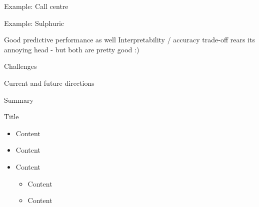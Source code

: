 \begin{frame}{Example: Call centre}
\end{frame}

\begin{frame}{Example: Sulphuric}
\end{frame}

\begin{frame}{Good predictive performance as well}
  Interpretability / accuracy trade-off rears its annoying head - but both are pretty good :)
\end{frame}

\begin{frame}{Challenges}
  
\end{frame}

\begin{frame}{Current and future directions}
  
\end{frame}

\begin{frame}{Summary}
  
\end{frame}



\begin{frame}{Title}
  \begin{itemize}
    \item Content
    \vspace{\baselineskip}
    \item Content
    \vspace{\baselineskip}
    \item Content
    \begin{itemize}
       \item Content
       \item Content
     \end{itemize}
  \end{itemize}
\end{frame}